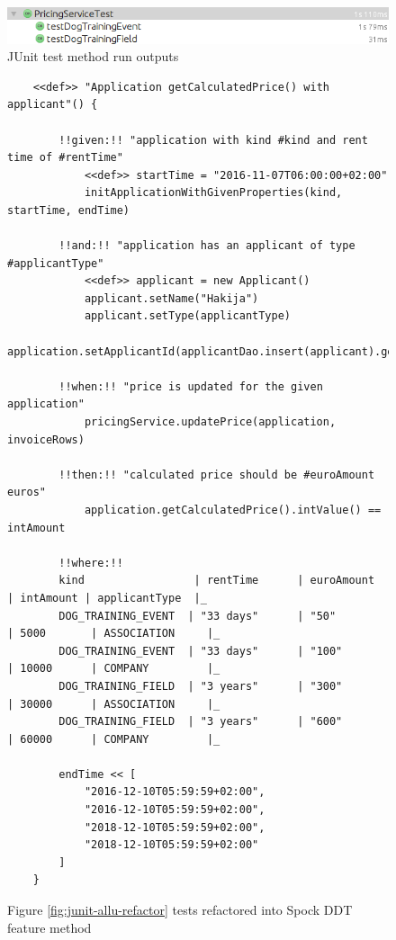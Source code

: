     \begin{figure}[H]
      \begin{center}
        \begin{topbot}[style=mdstyle]
        \includegraphics[width=\textwidth]{images/junit-pricing-results.png}
        \end{topbot}
        \caption{JUnit test method run outputs}
        \label{fig:junit-allu-refactor-output}
      \end{center}
    \end{figure}

    \begin{figure}[H]
        \begin{lstlisting}[style=java]
    %%@Unroll%%("getCalculatedPrice() with kind of #kind, rental time of #rentTime and applicant is #applicantType should amount to #euroAmount euros")
    <<def>> "Application getCalculatedPrice() with applicant"() {

        !!given:!! "application with kind #kind and rent time of #rentTime"
            <<def>> startTime = "2016-11-07T06:00:00+02:00"
            initApplicationWithGivenProperties(kind, startTime, endTime)

        !!and:!! "application has an applicant of type #applicantType"
            <<def>> applicant = new Applicant()
            applicant.setName("Hakija")
            applicant.setType(applicantType)
            application.setApplicantId(applicantDao.insert(applicant).getId())

        !!when:!! "price is updated for the given application"
            pricingService.updatePrice(application, invoiceRows)

        !!then:!! "calculated price should be #euroAmount euros"
            application.getCalculatedPrice().intValue() == intAmount

        !!where:!!
        kind                 | rentTime      | euroAmount    | intAmount | applicantType  |_
        DOG_TRAINING_EVENT  | "33 days"      | "50"          | 5000       | ASSOCIATION     |_
        DOG_TRAINING_EVENT  | "33 days"      | "100"         | 10000      | COMPANY         |_
        DOG_TRAINING_FIELD  | "3 years"      | "300"         | 30000      | ASSOCIATION     |_
        DOG_TRAINING_FIELD  | "3 years"      | "600"         | 60000      | COMPANY         |_

        endTime << [
            "2016-12-10T05:59:59+02:00",
            "2016-12-10T05:59:59+02:00",
            "2018-12-10T05:59:59+02:00",
            "2018-12-10T05:59:59+02:00"
        ]
    }
        \end{lstlisting}
        \caption{Figure \ref{fig:junit-allu-refactor} tests refactored into Spock DDT feature method}
        \label{fig:spock-allu-refactor}

    \end{figure}
